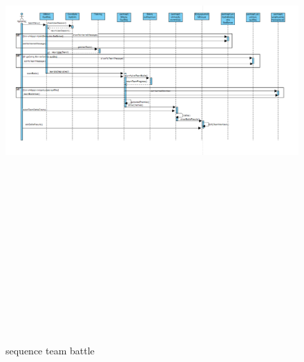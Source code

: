 \begin{figure}[!htb]
  \centering
    \centering
    \includegraphics[width=19.5cm,height=20cm]{sequence_teambattle.png}
    \caption{sequence team battle}
    \label{}
\end{figure}